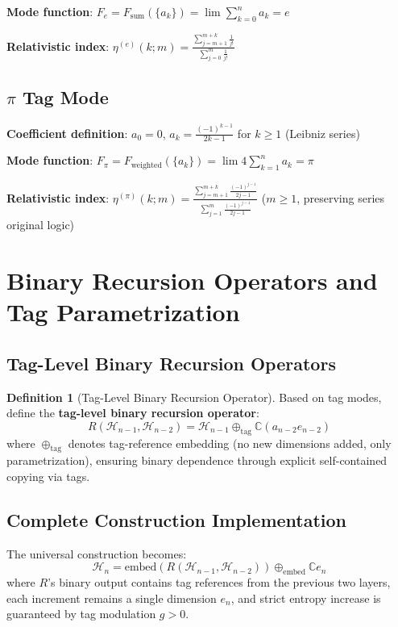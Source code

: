 \documentclass[12pt]{article}
\theoremstyle{plain}
\theoremstyle{definition}
\newtheorem{definition}[theorem]{Definition}
\begin{document}
\textbf{Mode function}: $F_e = F_{\text{sum}}(\{a_k\}) = \lim \sum_{k=0}^n a_k = e$

\textbf{Relativistic index}: $\eta^{(e)}(k; m) = \frac{\sum_{j=m+1}^{m+k} \frac{1}{j!}}{\sum_{j=0}^{m} \frac{1}{j!}}$

\subsection{$\pi$ Tag Mode}
\textbf{Coefficient definition}: $a_0 = 0$, $a_k = \frac{(-1)^{k-1}}{2k-1}$ for $k \geq 1$ (Leibniz series)

\textbf{Mode function}: $F_\pi = F_{\text{weighted}}(\{a_k\}) = \lim 4\sum_{k=1}^n a_k = \pi$

\textbf{Relativistic index}: $\eta^{(\pi)}(k; m) = \frac{\sum_{j=m+1}^{m+k} \frac{(-1)^{j-1}}{2j-1}}{\sum_{j=1}^{m} \frac{(-1)^{j-1}}{2j-1}}$ ($m \geq 1$, preserving series original logic)

\section{Binary Recursion Operators and Tag Parametrization}

\subsection{Tag-Level Binary Recursion Operators}

\begin{definition}[Tag-Level Binary Recursion Operator]
Based on tag modes, define the \textbf{tag-level binary recursion operator}:
$$R(\mathcal{H}_{n-1}, \mathcal{H}_{n-2}) = \mathcal{H}_{n-1} \oplus_{\text{tag}} \mathbb{C} (a_{n-2} e_{n-2})$$
where $\oplus_{\text{tag}}$ denotes tag-reference embedding (no new dimensions added, only parametrization), ensuring binary dependence through explicit self-contained copying via tags.
\end{definition}

\subsection{Complete Construction Implementation}

The universal construction becomes:
$$\mathcal{H}_n = \text{embed}(R(\mathcal{H}_{n-1}, \mathcal{H}_{n-2})) \oplus_{\text{embed}} \mathbb{C} e_n$$
where $R$'s binary output contains tag references from the previous two layers, each increment remains a single dimension $e_n$, and strict entropy increase is guaranteed by tag modulation $g > 0$.
\end{document}
